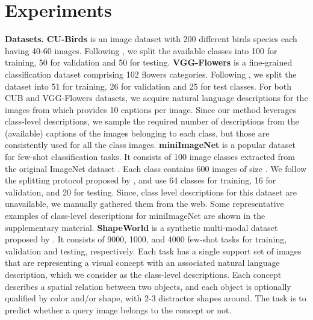 \documentclass{bmvc2k}
\begin{document}
\section{Experiments} \label{sec:experiments}
\noindent \textbf{Datasets.} 
\textbf{CU-Birds} \cite{WelinderEtal2010} is an image dataset with 200 different birds species each having 40-60 images. Following \cite{Su2020When}, we split the available classes into 100 for training, 50 for validation and 50 for testing.
\textbf{VGG-Flowers} is a fine-grained classification dataset comprising 102 flowers categories. Following \cite{Su2020When}, we split the dataset into 51 for training, 26 for validation and 25 for test classes. For both CUB and VGG-Flowers datasets, we acquire natural language descriptions for the images from \cite{reed2016learning} which provides 10 captions per image. Since our method leverages class-level descriptions, we sample the required number of descriptions from the (available) captions of the images belonging to each class, but those are consistently used for all the class images.
\textbf{miniImageNet} \cite{NIPS2016_90e13578} is a popular dataset for few-shot classification tasks. It consists of 100 image classes extracted from the original ImageNet dataset \cite{imagenet_cvpr09}. Each class contains 600 images of size . We follow the splitting protocol proposed by \cite{NIPS2016_90e13578}, and use 64 classes for training, 16 for validation, and 20 for testing. Since, class level descriptions for this dataset are unavailable, we manually gathered them from the web. Some representative examples of class-level descriptions for miniImageNet  are shown in the supplementary material. 
\textbf{ShapeWorld} is a synthetic multi-modal dataset proposed by \cite{Kuhnle2017ShapeWorldA}. It consists of 9000, 1000, and 4000 few-shot tasks for training, validation and testing, respectively. Each task has a single support set of  images that are representing a visual concept with an associated natural language description, which we consider as the class-level descriptions. Each concept describes a spatial relation between two objects, and each object is optionally qualified by color and/or shape, with 2-3 distractor shapes around. The task is to predict whether a query image belongs to the concept or not.
                 
\end{document}
